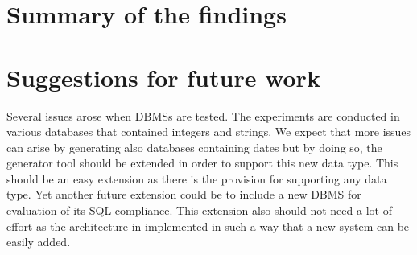 \section{Summary of the findings}


\section{Suggestions for future work}
Several issues arose when DBMSs are tested. The experiments are conducted in various databases that contained integers and strings. We expect that more issues can arise by generating also databases containing dates but by doing so, the generator tool should be extended in order to support this new data type. This should be an easy extension as there is the provision for supporting any data type. Yet another future extension could be to include a new DBMS for evaluation of its SQL-compliance. This extension also should not need a lot of effort as the architecture in implemented in such a way that a new system can be easily added.

